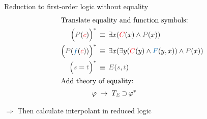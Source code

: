 \documentclass[final,hyperref={pdfpagelabels=true}]{beamer}
\newcommand{\colOne}[1]{{\color{TuInfRed}#1}}
\newcommand{\colTwo}[1]{{\color{TuWienBlue}#1}}
\newcommand{\colA}[1]{\colOne{#1}}
\newcommand{\colB}[1]{\colTwo{#1}}
\newcommand{\gray}[1]{{\color{InfosysDarkGrey}#1}}
\newcommand{\itemizeOnBlockStart}{
		\vspace*{-0.5em}
	}
\DeclareMathOperator{\limpl}{\supset}
\begin{document}
\begin{frame}
\begin{columns}[t]
\begin{column}{\mycolwidth}
			\begin{block}{Reduction to first-order logic without equality \cite{Craig57linear}} 
				\vspace*{-1em}
				\newcommand{\transformsep}{\;\to\;}
				\begin{align*}
					\intertext{Translate equality and function symbols:}
					\Big(\gray P(\colA c)\Big)^*  & \, \equiv \, \exists x (\colA C(x) \land \gray P(x)) \\
					\Big( \gray P(\colB f( \colA c)) \Big)^* & \, \equiv \, \exists x (  \exists y( \colA C(y) \land \colB F(y, x)) \land \gray P(x))  \\
					\Big( \gray s = \gray t \Big)^* & \, \equiv \, \gray E(\gray s, \gray t) \\
					\intertext{Add theory of equality:} 
					\varphi & \transformsep T_{\gray E} \limpl \varphi^*
				\end{align*}


				$\Rightarrow$ Then calculate interpolant in reduced logic


\end{block}
\end{column}
\end{columns}
\end{frame}
\end{document}
